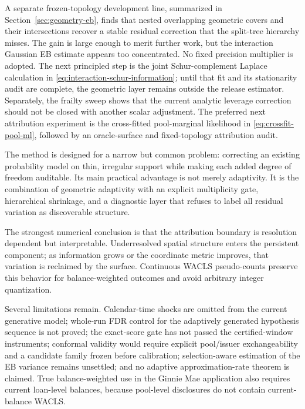\documentclass[11pt]{article}
\begin{document}
A separate frozen-topology development line, summarized in
Section~\ref{sec:geometry-eb}, finds that nested overlapping geometric covers and their
intersections recover a stable residual correction that the split-tree hierarchy misses. The gain is
large enough to merit further work, but the interaction Gaussian EB estimate appears too concentrated.
No fixed precision multiplier is adopted. The next principled step is the joint Schur-complement
Laplace calculation in \eqref{eq:interaction-schur-information}; until that fit and its stationarity
audit are complete, the geometric layer remains outside the release estimator. Separately, the
frailty sweep shows that the current analytic leverage correction should not be closed with another
scalar adjustment. The preferred next attribution experiment is the cross-fitted pool-marginal
likelihood in \eqref{eq:crossfit-pool-ml}, followed by an oracle-surface and fixed-topology
attribution audit.

The method is designed for a narrow but common problem: correcting an existing probability model on
thin, irregular support while making each added degree of freedom auditable. Its main practical
advantage is not merely adaptivity. It is the combination of geometric adaptivity with an explicit
multiplicity gate, hierarchical shrinkage, and a diagnostic layer that refuses to label all residual
variation as discoverable structure.

The strongest numerical conclusion is that the attribution boundary is resolution dependent but
interpretable. Underresolved spatial structure enters the persistent component; as information grows
or the coordinate metric improves, that variation is reclaimed by the surface. Continuous WACLS
pseudo-counts preserve this behavior for balance-weighted outcomes and avoid arbitrary integer
quantization.

Several limitations remain. Calendar-time shocks are omitted from the current generative model;
whole-run FDR control for the adaptively generated hypothesis sequence is not proved; the exact-score
gate has not passed the certified-window instruments; conformal validity would require explicit
pool/issuer exchangeability and a candidate family frozen before calibration; selection-aware
estimation of the EB variance remains unsettled; and no adaptive approximation-rate theorem is
claimed. True balance-weighted use in the Ginnie Mae application also requires current loan-level
balances, because pool-level disclosures do not contain current-balance WACLS.
\end{document}
